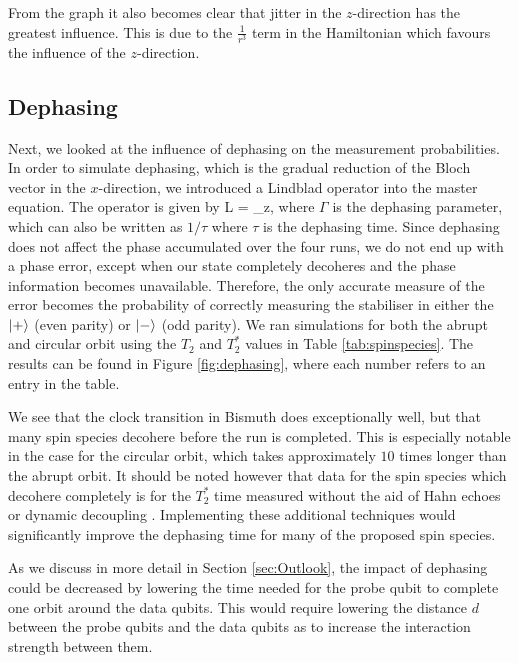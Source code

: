 From the graph it also becomes clear that jitter in the $z$-direction has the greatest influence. This is due to the $\frac{1}{r^3}$  term in the Hamiltonian which favours the influence of the $z$-direction. 





\subsection{Dephasing}
Next, we looked at the influence of dephasing on the measurement probabilities. In order to simulate dephasing, which is the gradual reduction of the Bloch vector in the $x$-direction, we introduced a Lindblad operator into the master equation. The operator is given by 
\beq
L  = \sqrt{\Gamma} \sigma_z,
\eeq
where $\Gamma$ is the dephasing parameter, which can also be written as $1/\tau$ where $\tau$ is the dephasing time. Since dephasing does not affect the phase accumulated over the four runs, we do not end up with a phase error, except when our state completely decoheres and the phase information becomes unavailable. Therefore, the only accurate measure of the error becomes the probability of correctly measuring the stabiliser in either the $\ket{+}$ (even parity) or $\ket{-}$ (odd parity). We ran simulations for both the abrupt and circular orbit using the $T_2$ and $T_2^*$ values in Table \ref{tab:spinspecies}. The results can be found in Figure \ref{fig:dephasing}, where each number refers to an entry in the table. 

We see that the clock transition in Bismuth does exceptionally well, but that many spin species decohere before the run is completed. This is especially notable in the case for the circular orbit, which takes approximately $10$ times longer than the abrupt orbit. It should be noted however that data for the spin species which decohere completely is for the $T_2^*$ time measured without the aid of Hahn echoes \cite{hahn} or dynamic decoupling \cite{something}. Implementing these additional techniques would significantly improve the dephasing time for many of the proposed spin species. 

As we discuss in more detail in Section \ref{sec:Outlook}, the impact of dephasing could be decreased by lowering the time needed for the probe qubit to complete one orbit around the data qubits. This would require lowering the distance $d$ between the probe qubits and the data qubits as to increase the interaction strength between them. 



